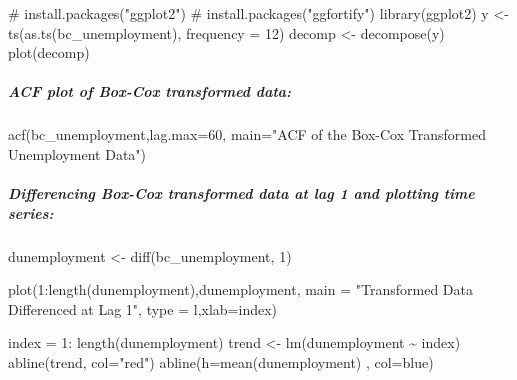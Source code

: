 \documentclass[
  letterpaper,
  DIV=11,
  numbers=noendperiod]{scrartcl}
\let\oldsubparagraph\subparagraph
\renewcommand{\subparagraph}[1]{\oldsubparagraph{#1}\mbox{}}
\newenvironment{Shaded}{\begin{snugshade}}{\end{snugshade}}
\newcommand{\AttributeTok}[1]{\textcolor[rgb]{0.40,0.45,0.13}{#1}}
\newcommand{\CommentTok}[1]{\textcolor[rgb]{0.37,0.37,0.37}{#1}}
\newcommand{\DecValTok}[1]{\textcolor[rgb]{0.68,0.00,0.00}{#1}}
\newcommand{\FunctionTok}[1]{\textcolor[rgb]{0.28,0.35,0.67}{#1}}
\newcommand{\NormalTok}[1]{\textcolor[rgb]{0.00,0.23,0.31}{#1}}
\newcommand{\OtherTok}[1]{\textcolor[rgb]{0.00,0.23,0.31}{#1}}
\newcommand{\SpecialCharTok}[1]{\textcolor[rgb]{0.37,0.37,0.37}{#1}}
\newcommand{\StringTok}[1]{\textcolor[rgb]{0.13,0.47,0.30}{#1}}
\begin{document}
\begin{Shaded}
\begin{Highlighting}[]
\CommentTok{\# install.packages("ggplot2")}
\CommentTok{\# install.packages("ggfortify")}
\FunctionTok{library}\NormalTok{(ggplot2)}
\NormalTok{y }\OtherTok{\textless{}{-}} \FunctionTok{ts}\NormalTok{(}\FunctionTok{as.ts}\NormalTok{(bc\_unemployment), }\AttributeTok{frequency =} \DecValTok{12}\NormalTok{)}
\NormalTok{decomp }\OtherTok{\textless{}{-}} \FunctionTok{decompose}\NormalTok{(y)}
\FunctionTok{plot}\NormalTok{(decomp)}
\end{Highlighting}
\end{Shaded}

\hypertarget{acf-plot-of-box-cox-transformed-data}{%
\subparagraph{ACF plot of Box-Cox transformed
data:}\label{acf-plot-of-box-cox-transformed-data}}

\begin{Shaded}
\begin{Highlighting}[]
\FunctionTok{acf}\NormalTok{(bc\_unemployment,}\AttributeTok{lag.max=}\DecValTok{60}\NormalTok{, }\AttributeTok{main=}\StringTok{"ACF of the Box{-}Cox Transformed Unemployment Data"}\NormalTok{) }
\end{Highlighting}
\end{Shaded}

\hypertarget{differencing-box-cox-transformed-data-at-lag-1-and-plotting-time-series}{%
\subparagraph{Differencing Box-Cox transformed data at lag 1 and
plotting time
series:}\label{differencing-box-cox-transformed-data-at-lag-1-and-plotting-time-series}}

\begin{Shaded}
\begin{Highlighting}[]
\NormalTok{dunemployment }\OtherTok{\textless{}{-}} \FunctionTok{diff}\NormalTok{(bc\_unemployment, }\DecValTok{1}\NormalTok{)}

\FunctionTok{plot}\NormalTok{(}\DecValTok{1}\SpecialCharTok{:}\FunctionTok{length}\NormalTok{(dunemployment),dunemployment, }\AttributeTok{main =} \StringTok{"Transformed Data Differenced at Lag 1"}\NormalTok{, }\AttributeTok{type =} \StringTok{\textquotesingle{}l\textquotesingle{}}\NormalTok{,}\AttributeTok{xlab=}\StringTok{\textquotesingle{}index\textquotesingle{}}\NormalTok{)}

\NormalTok{index }\OtherTok{=} \DecValTok{1}\SpecialCharTok{:} \FunctionTok{length}\NormalTok{(dunemployment)}
\NormalTok{trend }\OtherTok{\textless{}{-}} \FunctionTok{lm}\NormalTok{(dunemployment }\SpecialCharTok{\textasciitilde{}}\NormalTok{ index)}
\FunctionTok{abline}\NormalTok{(trend, }\AttributeTok{col=}\StringTok{"red"}\NormalTok{)}
\FunctionTok{abline}\NormalTok{(}\AttributeTok{h=}\FunctionTok{mean}\NormalTok{(dunemployment) , }\AttributeTok{col=}\StringTok{\textquotesingle{}blue\textquotesingle{}}\NormalTok{)}
\end{Highlighting}
\end{Shaded}
\end{document}
